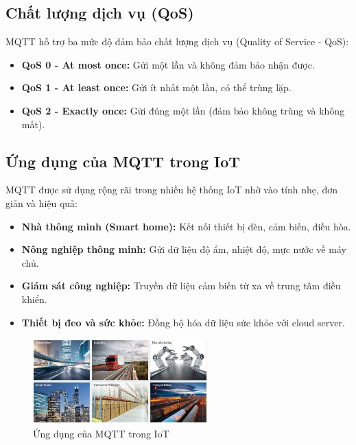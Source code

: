 \subsection{Chất lượng dịch vụ (QoS)}

MQTT hỗ trợ ba mức độ đảm bảo chất lượng dịch vụ (Quality of Service - QoS):

\begin{itemize}
    \item \textbf{QoS 0 - At most once:} Gửi một lần và không đảm bảo nhận được.
    \item \textbf{QoS 1 - At least once:} Gửi ít nhất một lần, có thể trùng lặp.
    \item \textbf{QoS 2 - Exactly once:} Gửi đúng một lần (đảm bảo không trùng và không mất).
\end{itemize}

\subsection{Ứng dụng của MQTT trong IoT}

MQTT được sử dụng rộng rãi trong nhiều hệ thống IoT nhờ vào tính nhẹ, đơn giản và hiệu quả:

\begin{itemize}
    \item \textbf{Nhà thông minh (Smart home):} Kết nối thiết bị đèn, cảm biến, điều hòa.
    \item \textbf{Nông nghiệp thông minh:} Gửi dữ liệu độ ẩm, nhiệt độ, mực nước về máy chủ.
    \item \textbf{Giám sát công nghiệp:} Truyền dữ liệu cảm biến từ xa về trung tâm điều khiển.
    \item \textbf{Thiết bị đeo và sức khỏe:} Đồng bộ hóa dữ liệu sức khỏe với cloud server.
\end{itemize}
\begin{figure}[H]
  \centering
  \includegraphics[width=0.6\textwidth]{Images/ung-dung-mqtt.png}
  \caption{Ứng dụng của MQTT trong IoT}
\end{figure}

